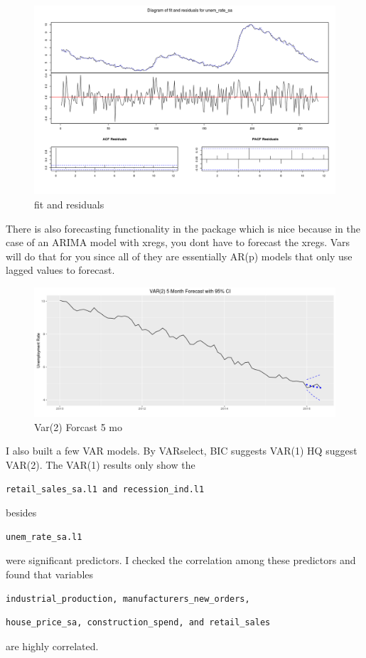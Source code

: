 \documentclass[twoside,twocolumn]{article}
\begin{document}
   \begin{figure}[H]
    	\centering
     	\caption{fit and residuals}
     	\includegraphics[width=\linewidth]{images/unem_rate_fit_resid}
 \end{figure}
 
 There is also forecasting functionality in the package which is nice because in the case of an ARIMA model with xregs, you dont have to forecast the xregs. Vars will do that for you since all of they are essentially AR(p) models that only use lagged values to forecast.
 
    \begin{figure}[H]
    	\centering
     	\caption{Var(2) Forcast 5 mo}
     	\includegraphics[width=\linewidth]{images/var25mo}
 \end{figure}
 
I also built a few VAR models. By VARselect, BIC suggests VAR(1) HQ suggest VAR(2). The VAR(1) results only show the \begin{verbatim}retail_sales_sa.l1 and recession_ind.l1\end{verbatim} besides \begin{verbatim}unem_rate_sa.l1\end{verbatim} were significant predictors. I checked the correlation among these predictors and found that variables \begin{verbatim}industrial_production, manufacturers_new_orders, \end{verbatim} \begin{verbatim}house_price_sa, construction_spend, and retail_sales\end{verbatim} are highly correlated.
\end{document}

